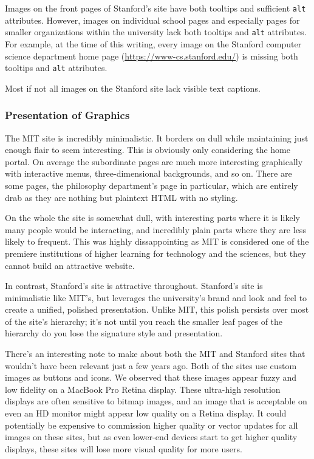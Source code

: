 \begin{FlushLeft}
Images on the front pages of Stanford's site have both tooltips and sufficient
\texttt{alt} attributes. However, images on individual school pages and especially
pages for smaller organizations within the university lack both tooltips and
\texttt{alt} attributes. For example, at the time of this writing, every image
on the Stanford computer science department home page (\url{https://www-cs.stanford.edu/})
is missing both tooltips and \texttt{alt} attributes.

Most if not all images on the Stanford site lack visible text captions.

\subsubsection*{Presentation of Graphics}

The MIT site is incredibly minimalistic. It borders on dull while maintaining just enough flair
to seem interesting. This is obviously only considering the home portal. On average the
subordinate pages are much more interesting graphically with interactive menus,
three-dimensional backgrounds, and so on. There are some pages, the philosophy department's
page in particular, which are entirely drab as they are nothing but plaintext HTML with no
styling.

On the whole the site is somewhat dull, with interesting parts where it is likely many
people would be interacting, and incredibly plain parts where they are less likely to
frequent. This was highly dissappointing as MIT is considered one of the premiere
institutions of higher learning for technology and the sciences, but they cannot build an
attractive website.

In contrast, Stanford's site is attractive throughout. Stanford's site is minimalistic
like MIT's, but leverages the university's brand and look and feel to create a unified,
polished presentation. Unlike MIT, this polish persists over most of the site's
hierarchy; it's not until you reach the smaller leaf pages of the hierarchy do you
lose the signature style and presentation.

There's an interesting note to make about both the MIT and Stanford sites that wouldn't
have been relevant just a few years ago. Both of the sites use custom images as buttons
and icons. We observed that these images appear fuzzy and low fidelity on a MacBook
Pro Retina display. These ultra-high resolution displays are often sensitive to
bitmap images, and an image that is acceptable on even an HD monitor might appear
low quality on a Retina display. It could potentially be expensive to commission
higher quality or vector updates for all images on these sites, but as even lower-end
devices start to get higher quality displays, these sites will lose more visual
quality for more users.


\end{FlushLeft}
